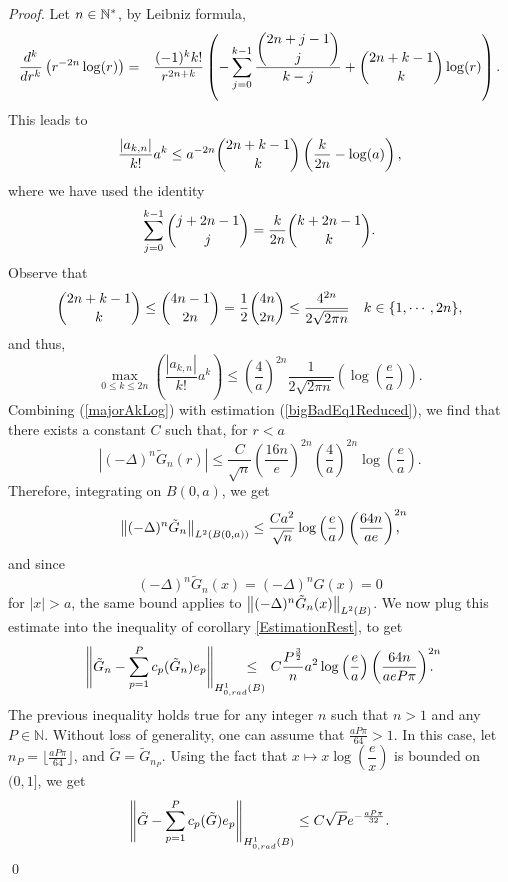 \documentclass[smallextended]{svjour3}
\begin{document}
\begin{proof}
	Let $n \in \mathbb{N}^*$, by Leibniz formula, 
	\begin{eqnarray*}						
		\dfrac{d^k }{dr^k}\left(r^{-2n}\log(r)\right) & = & \dfrac{(-1)^k k!}{r^{2n+k}}  \left(-\displaystyle\sum_{j=0}^{k-1}\dfrac{\dbinom{2n+j-1}{j}}{k-j}+\dbinom{2n+k-1}{k}\log(r)\right). \\
	\end{eqnarray*}
	This leads to \[\dfrac{|a_{k,n}|}{k!}a^k \leq a^{-2n} \dbinom{2n + k -1}{k}\left(\frac{k}{2n}-\log(a)\right),\]
	where we have used the identity
	\begin{equation*}
		\sum_{j=0}^{k-1}\dbinom{j+2n-1}{j} = \dfrac{k}{2n}\dbinom{k+2n-1}{k}.
	\end{equation*}
	Observe that
	\begin{equation*}
		\dbinom{2n+k-1}{k}\leq \dbinom{4n-1}{2n} = \frac{1}{2}\dbinom{4n}{2n} \leq \dfrac{4^{2n}}{2\sqrt{2\pi n}} \quad k \in \{1,\cdots,2n\},
	\end{equation*}
	and thus,
	\begin{equation}
		\max_{0\leq k \leq 2n}\left(\dfrac{|a_{k,n}|}{k!}a^k\right) \leq \left(\frac{4}{a}\right)^{2n}\dfrac{1}{2\sqrt{2\pi n}}\left(\log\left(\frac{e}{a}\right)\right).
		\label{majorAkLog} 
	\end{equation}							
	Combining (\ref{majorAkLog}) with estimation (\ref{bigBadEq1Reduced}), we find that there exists a constant $C$ such that, for $r<a$
	\[|(-\Delta)^n \tilde{G}_n (r)|\leq \dfrac{C}{\sqrt{n}}\left( \frac{16n}{e}\right)^{2n}\left(\frac{4}{a}\right)^{2n}\log\left(\dfrac{e}{a}\right).\]
	Therefore, integrating on $B(0,a)$, we get
	\[ \left\|(-\Delta)^n \tilde{G}_n\right\|_{L^2(B(0,a))} \leq \dfrac{C a^2}{\sqrt{n}}\log\left(\frac{e}{a}\right)\left( \frac{64n}{ae}\right)^{2n}\!\!\!\!\!\!,\]
	and since 
	\[(-\Delta)^n \tilde{G}_n(x) = (-\Delta)^n G(x) = 0\]
	for $|x|>a$, the same bound applies to $\left\|(-\Delta)^n \tilde{G}_n(x)\right\|_{L^2(B)}$. 
	We now plug this estimate into the inequality of corollary \ref{EstimationRest}, to get
	\[ \norm{\tilde{G}_n - \sum_{p=1}^{P}c_p(\tilde{G}_n)e_p}_{\Hzrad} \!\!\!\!\!\!\!\!\!\!\leq~~ C \dfrac{P^\frac{3}{2}}{n} a^2 \log\left(\dfrac{e}{a}\right)\left( \frac{64 n}{ae P \pi}\right)^{2n}\!\!\!\!\!\!.\] 
	The previous inequality holds true for any integer $n$ such that $n>1$ and any $P \in \mathbb{N}$. Without loss of generality, one can assume that $\frac{aP\pi}{64} >1$. In this case, let $n_P = \lfloor \frac{aP\pi}{64}\rfloor $, and $\tilde{G} = \tilde{G}_{n_P}$. Using the fact that $x\mapsto x \log\left(\dfrac{e}{x}\right)$ is bounded on $(0,1]$, we get 
	\[ \left\|\tilde{G} - \sum_{p=1}^{P}c_p(\tilde{G})e_p\right\|_{H^1_{0,rad}(B)} \leq C \sqrt{P} e^{-\frac{aP\pi}{32}}.\]
	\qed
\end{proof}																												
\end{document}
